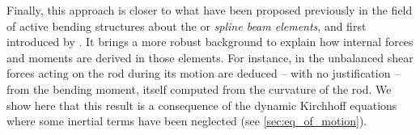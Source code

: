 Finally, this approach is closer  to what have been proposed previously in the field of active bending structures about the  or  \emph{spline beam elements}, and first introduced by . It brings a more robust background to explain how internal forces and moments are derived in those elements. For instance, in \cite{Adriaenssens2001,Douthe2006,DAmico2014} the unbalanced shear forces acting on the rod during its motion are deduced -- with no justification -- from the bending moment, itself computed from the curvature of the rod. We show here that this result is a consequence of the dynamic Kirchhoff equations where some inertial terms have been neglected (see \cref{sec:eq_of_motion}).



%
%
%
%
%
%
%
%
%
%
%
